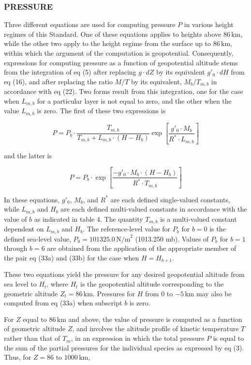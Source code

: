\documentclass{article}
\begin{document}
\subsubsection{PRESSURE}

Three different equations are used for computing pressure $P$ in various height regimes of this Standard. One of these equations applies to heights above $86 \, \text{km}$, while the other two apply to the height regime from the surface up to $86 \, \text{km}$, within which the argument of the computation is geopotential. Consequently, expressions for computing pressure as a function of geopotential altitude stems from the integration of eq (5) after replacing $g \cdot dZ$ by its equivalent $g'_0 \cdot dH$ from eq (16), and after replacing the ratio $M/T$ by its equivalent, $M_b/T_{m,b}$ in accordance with eq (22). Two forms result from this integration, one for the case when $L_{m,b}$ for a particular layer is not equal to zero, and the other when the value $L_{m,b}$ is zero. The first of these two expressions is

\[
P = P_b \cdot \frac{T_{m,b}}{T_{m,b} + L_{m,b} \cdot (H - H_b)} \exp \left[ \frac{g'_0 \cdot M_b}{R^* \cdot L_{m,b}} \right] \tag{33a}
\]

and the latter is 

\[
P = P_b \cdot \exp \left[ \frac{-g'_0 \cdot M_b \cdot (H - H_b)}{R^* \cdot T_{m,b}} \right] \tag{33b}
\]

In these equations, $g'_0$, $M_b$, and $R^*$ are each defined single-valued constants, while $L_{m,b}$ and $H_b$ are each defined multi-valued constants in accordance with the value of $b$ as indicated in table 4. The quantity $T_{m,b}$ is a multi-valued constant dependent on $L_{m,b}$ and $H_b$. The reference-level value for $P_b$ for $b = 0$ is the defined sea-level value, $P_0 = 101325.0 \, \text{N/m}^2$ (1013.250 mb). Values of $P_b$ for $b = 1$ through $b = 6$ are obtained from the application of the appropriate member of the pair eq (33a) and (33b) for the case when $H = H_{b+1}$.

These two equations yield the pressure for any desired geopotential altitude from sea level to $H_t$, where $H_t$ is the geopotential altitude corresponding to the geometric altitude $Z_t = 86 \, \text{km}$. Pressures for $H$ from $0$ to $-5 \, \text{km}$ may also be computed from eq (33a) when subscript $b$ is zero.

For $Z$ equal to $86 \, \text{km}$ and above, the value of pressure is computed as a function of geometric altitude $Z$, and involves the altitude profile of kinetic temperature $T$ rather than that of $T_m$, in an expression in which the total pressure $P$ is equal to the sum of the partial pressures for the individual species as expressed by eq (3). Thus, for $Z = 86$ to $1000 \, \text{km}$,
\end{document}
